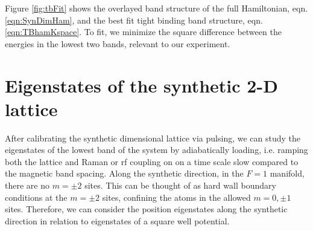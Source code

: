 %
%
%
%
%
%
%

Figure \ref{fig:tbFit} shows the overlayed band structure of the full Hamiltonian, eqn. \ref{eqn:SynDimHam}, and the best fit tight binding band structure, eqn. \ref{eqn:TBhamKspace}. To fit, we minimize the square difference between the energies in the lowest two bands, relevant to our experiment. 

\section{Eigenstates of the synthetic 2-D lattice}

After calibrating the synthetic dimensional lattice via pulsing, we can study the eigenstates of the lowest band of the system by adiabatically loading, i.e. ramping both the lattice and Raman or rf coupling on on a time scale slow compared to the magnetic band spacing. Along the synthetic direction, in the $F=1$ manifold, there are no $m=\pm2$ sites. This can be thought of as hard wall boundary conditions at the $m=\pm2$ sites, confining the atoms in the allowed $m=0,\pm1$ sites. Therefore, we can consider the position eigenstates along the synthetic direction in relation to eigenstates of a square well potential. 

